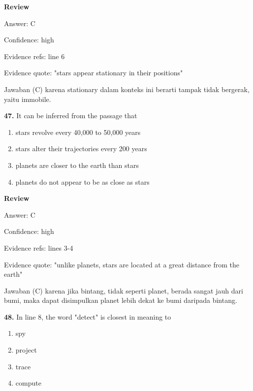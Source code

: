 \documentclass[12pt]{article}
\begin{document}
\par
\begingroup
\setlength{\parskip}{0pt}
\setlength{\parindent}{0pt}
\textbf{Review}\par
Answer: C\par
Confidence: high\par
Evidence refs: line 6\par
Evidence quote: "stars appear stationary in their positions"\par
Jawaban (C) karena stationary dalam konteks ini berarti tampak tidak bergerak, yaitu immobile.\par
\endgroup
\par
\vspace{0.25\baselineskip}
\noindent\textbf{47.} It can be inferred from the passage that
\begin{enumerate}[label=(\Alph*),leftmargin=*,itemsep=0.2em]
\item stars revolve every 40,000 to 50,000 years
\item stars alter their trajectories every 200 years
\item planets are closer to the earth than stars
\item planets do not appear to be as close as stars
\end{enumerate}
\par
\begingroup
\setlength{\parskip}{0pt}
\setlength{\parindent}{0pt}
\textbf{Review}\par
Answer: C\par
Confidence: high\par
Evidence refs: lines 3-4\par
Evidence quote: "unlike planets, stars are located at a great distance from the earth"\par
Jawaban (C) karena jika bintang, tidak seperti planet, berada sangat jauh dari bumi, maka dapat disimpulkan planet lebih dekat ke bumi daripada bintang.\par
\endgroup
\par
\vspace{0.25\baselineskip}
\noindent\textbf{48.} In line 8, the word "detect" is closest in meaning to
\begin{enumerate}[label=(\Alph*),leftmargin=*,itemsep=0.2em]
\item spy
\item project
\item trace
\item compute
\end{enumerate}
\par
\begingroup
\end{document}
